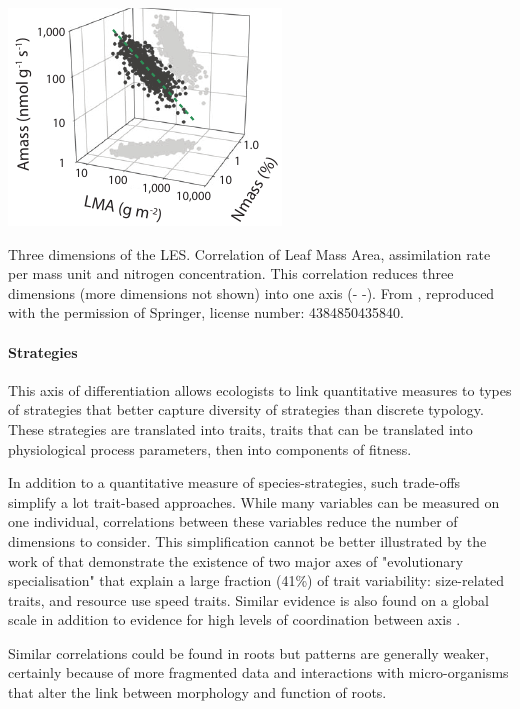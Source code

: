 \begin{marginfigure}
    \includegraphics{./Figures/LES1_m.pdf}
  \caption[Leaf Economic Spectrum]{Three dimensions of the LES. Correlation of Leaf Mass Area, assimilation rate per mass unit and nitrogen concentration. This correlation reduces three dimensions (more dimensions not shown) into one axis (\textcolor{myGreen}{- -}). From \citet{wright_worldwide_2004}, reproduced with the permission of Springer, license number: 4384850435840. }
  \label{fg:insurance}
\end{marginfigure}

\paragraph{Strategies}
This axis of differentiation allows ecologists to link quantitative measures to types of strategies that better capture diversity of strategies than discrete typology. These strategies are translated into traits, traits that can be translated into physiological process parameters, then into components of fitness.

In addition to a quantitative measure of species-strategies, such trade-offs simplify a lot trait-based approaches. While many variables can be measured on one individual, correlations between these variables reduce the number of dimensions to consider. This simplification cannot be better illustrated by the work of \citet{diaz_plant_2004} that demonstrate the existence of two major axes of "evolutionary specialisation" that explain a large fraction (41\%) of trait variability: size-related traits, and resource use speed traits. Similar evidence is also found on a global scale in addition to evidence for high levels of coordination between axis \parencite{diaz_global_2016}.


Similar correlations could be found in roots \parencite{ryser_importance_1996, reich_world-wide_2014} but patterns are generally weaker, certainly because of more fragmented data and interactions with micro-organisms that alter the link between morphology and function of roots.

